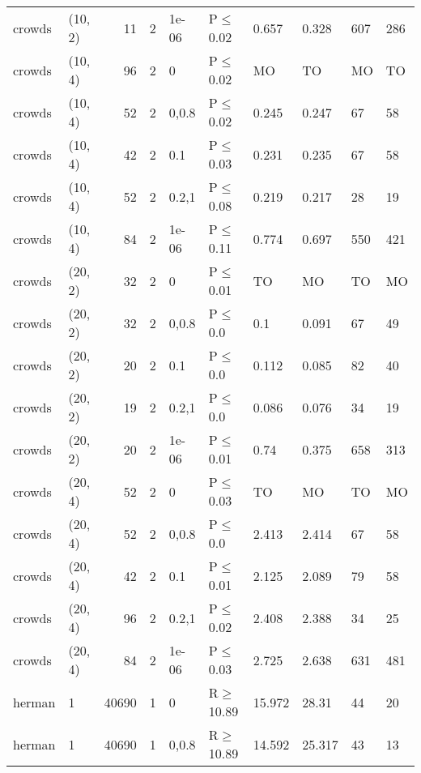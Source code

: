 \begin{longtable}{llrrllllll}
 crowds        & (10, 2)   &     	11 &   2 & 1e-06 & P$\leq$0.02  & 0.657   & 0.328   & 607     & 286  \\
 crowds        & (10, 4)   &     	96 &   2 & 0     & P$\leq$0.02  & MO      & TO      & MO      & TO   \\
 crowds        & (10, 4)   &     	52 &   2 & 0,0.8 & P$\leq$0.02  & 0.245   & 0.247   & 67      & 58   \\
 crowds        & (10, 4)   &     	42 &   2 & 0.1   & P$\leq$0.03  & 0.231   & 0.235   & 67      & 58   \\
 crowds        & (10, 4)   &     	52 &   2 & 0.2,1 & P$\leq$0.08  & 0.219   & 0.217   & 28      & 19   \\
 crowds        & (10, 4)   &     	84 &   2 & 1e-06 & P$\leq$0.11  & 0.774   & 0.697   & 550     & 421  \\
 crowds        & (20, 2)   &     	32 &   2 & 0     & P$\leq$0.01  & TO      & MO      & TO      & MO   \\
 crowds        & (20, 2)   &     	32 &   2 & 0,0.8 & P$\leq$0.0   & 0.1     & 0.091   & 67      & 49   \\
 crowds        & (20, 2)   &     	20 &   2 & 0.1   & P$\leq$0.0   & 0.112   & 0.085   & 82      & 40   \\
 crowds        & (20, 2)   &     	19 &   2 & 0.2,1 & P$\leq$0.0   & 0.086   & 0.076   & 34      & 19   \\
 crowds        & (20, 2)   &     	20 &   2 & 1e-06 & P$\leq$0.01  & 0.74    & 0.375   & 658     & 313  \\
 crowds        & (20, 4)   &     	52 &   2 & 0     & P$\leq$0.03  & TO      & MO      & TO      & MO   \\
 crowds        & (20, 4)   &     	52 &   2 & 0,0.8 & P$\leq$0.0   & 2.413   & 2.414   & 67      & 58   \\
 crowds        & (20, 4)   &     	42 &   2 & 0.1   & P$\leq$0.01  & 2.125   & 2.089   & 79      & 58   \\
 crowds        & (20, 4)   &     	96 &   2 & 0.2,1 & P$\leq$0.02  & 2.408   & 2.388   & 34      & 25   \\
 crowds        & (20, 4)   &     	84 &   2 & 1e-06 & P$\leq$0.03  & 2.725   & 2.638   & 631     & 481  \\
 herman        & 1         &  	40690 &   1 & 0     & R$\geq$10.89 & 15.972  & 28.31   & 44      & 20   \\
 herman        & 1         &  	40690 &   1 & 0,0.8 & R$\geq$10.89 & 14.592  & 25.317  & 43      & 13   \\

\end{longtable}
